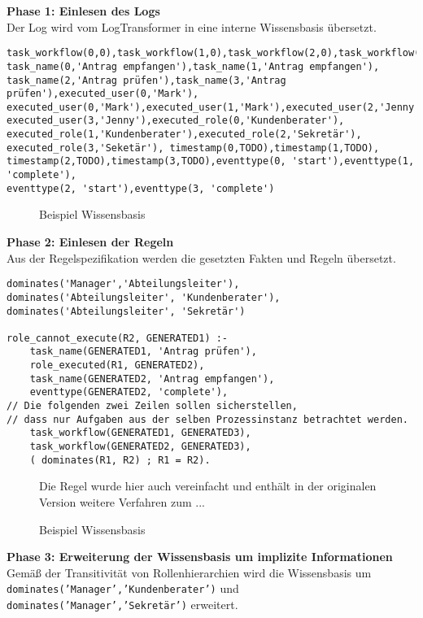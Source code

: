 \newpage
\textbf{Phase 1: Einlesen des Logs}\\
Der Log wird vom LogTransformer in eine interne Wissensbasis übersetzt.
\begin{verbatim}
task_workflow(0,0),task_workflow(1,0),task_workflow(2,0),task_workflow(3,0),
task_name(0,'Antrag empfangen'),task_name(1,'Antrag empfangen'),
task_name(2,'Antrag prüfen'),task_name(3,'Antrag prüfen'),executed_user(0,'Mark'),
executed_user(0,'Mark'),executed_user(1,'Mark'),executed_user(2,'Jenny'),
executed_user(3,'Jenny'),executed_role(0,'Kundenberater'),
executed_role(1,'Kundenberater'),executed_role(2,'Sekretär'),
executed_role(3,'Seketär'), timestamp(0,TODO),timestamp(1,TODO),
timestamp(2,TODO),timestamp(3,TODO),eventtype(0, 'start'),eventtype(1, 'complete'),
eventtype(2, 'start'),eventtype(3, 'complete')
\end{verbatim}
\begin{figure}[h]
\caption{Beispiel Wissensbasis}
\end{figure}

\textbf{Phase 2: Einlesen der Regeln}\\
Aus der Regelspezifikation werden die gesetzten Fakten und Regeln übersetzt.

\begin{verbatim}
dominates('Manager','Abteilungsleiter'),
dominates('Abteilungsleiter', 'Kundenberater'),
dominates('Abteilungsleiter', 'Sekretär')

role_cannot_execute(R2, GENERATED1) :- 
    task_name(GENERATED1, 'Antrag prüfen'),
    role_executed(R1, GENERATED2),
    task_name(GENERATED2, 'Antrag empfangen'),
    eventtype(GENERATED2, 'complete'),
// Die folgenden zwei Zeilen sollen sicherstellen, 
// dass nur Aufgaben aus der selben Prozessinstanz betrachtet werden.
    task_workflow(GENERATED1, GENERATED3), 
    task_workflow(GENERATED2, GENERATED3),
    ( dominates(R1, R2) ; R1 = R2).
\end{verbatim}
\begin{figure}[h]
Die Regel wurde hier auch vereinfacht und enthält in der originalen Version weitere Verfahren zum ...
\caption{Beispiel Wissensbasis}
\end{figure}

\textbf{Phase 3: Erweiterung der Wissensbasis um implizite Informationen}\\
Gemäß der Transitivität von Rollenhierarchien wird die Wissensbasis um \\\texttt{dominates('Manager','Kundenberater')} und 
\texttt{dominates('Manager','Sekretär')} erweitert.

